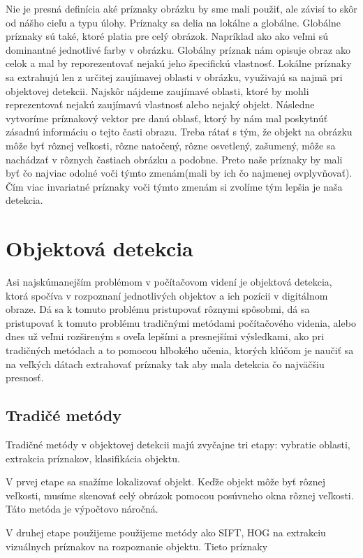 Nie je presná definícia aké príznaky obrázku by sme mali použiť, ale závisí to skôr od nášho cieľu a typu úlohy. Príznaky sa delia na lokálne a globálne. Globálne príznaky sú také, ktoré platia pre celý obrázok. Napríklad ako ako veľmi sú dominantné jednotlivé farby v obrázku. Globálny príznak nám opisuje obraz ako celok a mal by reporezentovať nejakú jeho špecifickú vlastnosť. Lokálne príznaky sa extrahujú len z určitej zaujímavej oblasti v obrázku, využivajú sa najmä pri objektovej detekcii. Najskôr nájdeme zaujímavé oblasti, ktoré by mohli reprezentovať nejakú zaujímavú vlastnosť alebo nejaký objekt. Následne vytvoríme príznakový vektor pre danú oblasť, ktorý by nám mal poskytnúť zásadnú informáciu o tejto časti obrazu. Treba rátať s tým, že objekt na obrázku môže byť rôznej veľkosti, rôzne natočený, rôzne osvetlený, zašumený, môže sa nachádzať v rôznych častiach obrázku a podobne. Preto naše príznaky by mali byť čo najviac odolné voči týmto zmenám(mali by ich čo najmenej ovplyvňovať). Čím viac invariatné príznaky voči týmto zmenám si zvolíme tým lepšia je naša detekcia. 

\section{Objektová detekcia}

\hspace{\parindent}Asi najskúmanejším problémom v počítačovom videní je objektová detekcia, ktorá spočíva v rozpoznaní jednotlivých objektov a ich pozícii v digitálnom obraze. Dá sa k tomuto problému pristupovať rôznymi spôsobmi, dá sa pristupovať k tomuto problému tradičnými metódami počítačového videnia, alebo dnes už veľmi rozšireným s oveľa lepšími a presnejšími výsledkami, ako pri tradičných metódach a to pomocou hlbokého učenia, ktorých klúčom je naučiť sa na veľkých dátach extrahovať príznaky tak aby mala detekcia čo najväčšiu presnosť.

\subsection{Tradičé metódy}
\hspace{\parindent}Tradičné metódy v objektovej detekcii majú zvyčajne tri etapy: vybratie oblasti, extrakcia príznakov, klasifikácia objektu. 

V prvej etape sa snažíme lokalizovať objekt. Keďže objekt môže byť rôznej veľkosti, musíme skenovať celý obrázok pomocou posúvneho okna rôznej veľkosti. Táto metóda je výpočtovo náročná. 

V druhej etape použijeme použijeme metódy ako SIFT, HOG na extrakciu vizuálnych príznakov na rozpoznanie objektu. Tieto  príznaky 

